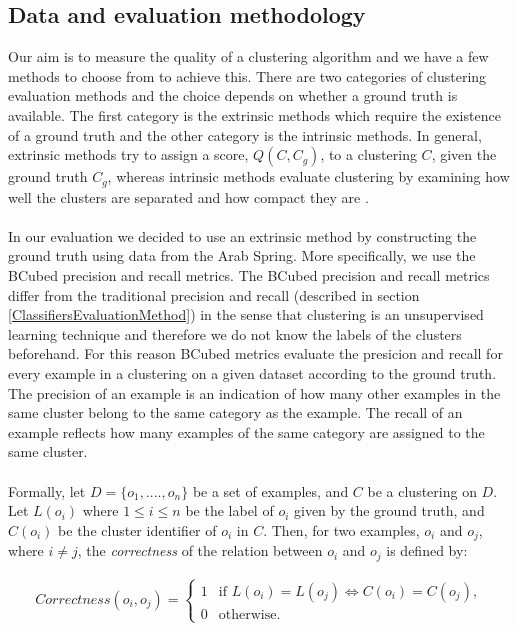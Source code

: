    
\subsection{Data and evaluation methodology}\label{ClusteringEvaluationMethod}
Our aim is to measure the quality of a clustering algorithm and we have a few methods to choose from to achieve this. There are two categories of clustering evaluation methods and the choice depends
on whether a ground truth is available. The first category is the extrinsic methods which require the existence of a ground truth and the other category is the intrinsic methods. In general, extrinsic methods try to assign a score, $Q(C, C_g)$, to a clustering $C$, given the ground truth $C_g$, whereas intrinsic methods evaluate clustering by examining how well the clusters are separated and how compact they are \citep{han2005}.\\\\ 
In our evaluation we decided to use an extrinsic method by constructing the ground truth using data from the Arab Spring. More specifically, we use the BCubed precision and recall metrics. The BCubed precision and recall metrics differ from the traditional precision and recall (described in section \ref{ClassifiersEvaluationMethod}) in the sense that clustering is an unsupervised learning technique and therefore we do not know the labels of the clusters beforehand. For this reason BCubed metrics evaluate the presicion and recall for every example in a clustering on a given dataset according to the ground truth. The precision of an example is an indication of how many other examples in the same cluster belong to the same category as the example. The recall of an example reflects how many examples of the same category are assigned to the same cluster.\\\\ 
Formally, let $D = \{ o_1,....,o_n \}$ be a set of examples, and $C$ be a clustering on $D$. Let $L(o_i)$ where $1 \leq i \leq n$ be the label of $o_i$ given by the ground truth, and $C(o_i)$ be the cluster identifier of $o_i$ in $C$. Then, for two examples, $o_i$ and $o_j$, where $i \neq j$, the \emph{correctness} of the relation between $o_i$ and $o_j$ is defined by:

\begin{eqnarray}
Correctness(o_i, o_j) = \begin{cases}
                          1& \text{if $L(o_i) = L(o_j) \Leftrightarrow C(o_i) = C(o_j) $},\\
                          0& \text{otherwise}.
                        \end{cases}
\end{eqnarray} 

